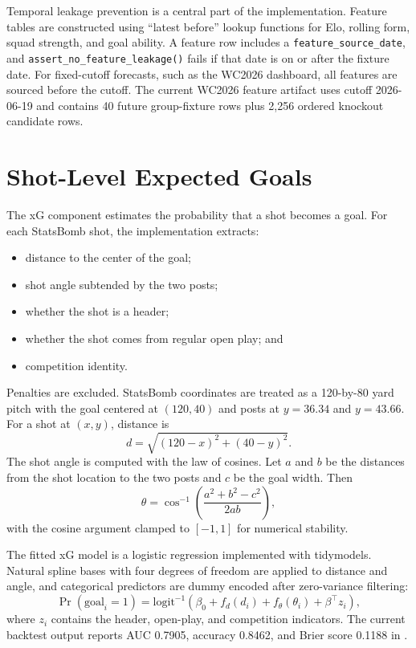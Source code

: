 \documentclass[11pt]{article}
\begin{document}
Temporal leakage prevention is a central part of the implementation. Feature
tables are constructed using ``latest before'' lookup functions for Elo,
rolling form, squad strength, and goal ability. A feature row includes a
\texttt{feature\_source\_date}, and \texttt{assert\_no\_feature\_leakage()}
fails if that date is on or after the fixture date. For fixed-cutoff forecasts,
such as the WC2026 dashboard, all features are sourced before the cutoff. The
current WC2026 feature artifact uses cutoff 2026-06-19 and contains 40 future
group-fixture rows plus 2,256 ordered knockout candidate rows.

\section{Shot-Level Expected Goals}

The xG component estimates the probability that a shot becomes a goal. For each
StatsBomb shot, the implementation extracts:

\begin{itemize}[leftmargin=*]
  \item distance to the center of the goal;
  \item shot angle subtended by the two posts;
  \item whether the shot is a header;
  \item whether the shot comes from regular open play; and
  \item competition identity.
\end{itemize}

Penalties are excluded. StatsBomb coordinates are treated as a 120-by-80 yard
pitch with the goal centered at $(120,40)$ and posts at $y=36.34$ and
$y=43.66$. For a shot at $(x,y)$, distance is
\[
d = \sqrt{(120 - x)^2 + (40 - y)^2}.
\]
The shot angle is computed with the law of cosines. Let $a$ and $b$ be the
distances from the shot location to the two posts and $c$ be the goal width.
Then
\[
\theta = \cos^{-1}\left(\frac{a^2 + b^2 - c^2}{2ab}\right),
\]
with the cosine argument clamped to $[-1,1]$ for numerical stability.

The fitted xG model is a logistic regression implemented with tidymodels. Natural
spline bases with four degrees of freedom are applied to distance and angle, and
categorical predictors are dummy encoded after zero-variance filtering:
\[
\Pr(\mathrm{goal}_i = 1)
  = \mathrm{logit}^{-1}\left(\beta_0
  + f_d(d_i) + f_\theta(\theta_i) + \beta^\top z_i\right),
\]
where $z_i$ contains the header, open-play, and competition indicators. The
current backtest output reports AUC 0.7905, accuracy 0.8462, and Brier score
0.1188 in .
\end{document}
